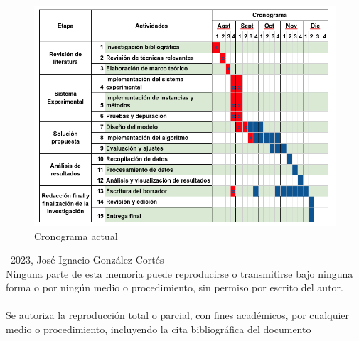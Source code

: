 \documentclass[spanish, a4paper, 12pt, twoside, openany,final]{book}
\numberwithin{equation}{section}                %
\begin{document}
\vfill
\begin{center}
\begin{figure}
    \centering
    \includegraphics[width=1.1\linewidth]{Images/image.png}
    \caption{Cronograma actual}
    \label{fig:cronograma}
\end{figure}
\end{center}

\thispagestyle{empty}
\mbox{}                         %
\vfill                          %
\textcopyright\ 2023, José Ignacio González Cortés \\ %
Ninguna parte de esta memoria puede reproducirse o transmitirse bajo ninguna forma o por ningún medio o procedimiento, sin permiso por escrito del autor.\\\\
Se autoriza la reproducción total o parcial, con fines académicos, por cualquier medio o procedimiento, incluyendo la cita bibliográfica del documento
\vspace{1cm}    %
\restoregeometry %




\end{document}
